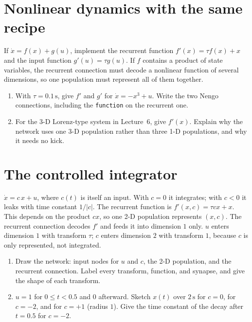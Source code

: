 \documentclass[11pt,letterpaper]{article}
\begin{document}
\section{Nonlinear dynamics with the same recipe}

\begin{idea}
If $\dot x = f(x) + g(u)$, implement the recurrent function $f'(x) = \tau f(x) + x$ and the input function $g'(u) = \tau g(u)$. If $f$ contains a product of state variables, the recurrent connection must decode a nonlinear function of several dimensions, so one population must represent all of them together.
\end{idea}

\begin{enumerate}
\item With $\tau = 0.1\,\mathrm{s}$, give $f'$ and $g'$ for $\dot x = -x^3 + u$. Write the two Nengo connections, including the \texttt{function} on the recurrent one.
\item For the 3-D Lorenz-type system in Lecture~6, give $f'(x)$. Explain why the network uses one 3-D population rather than three 1-D populations, and why it needs no kick.
\end{enumerate}

\section{The controlled integrator}

\begin{idea}
$\dot x = c\,x + u$, where $c(t)$ is itself an input. With $c = 0$ it integrates; with $c < 0$ it leaks with time constant $1/|c|$. The recurrent function is $f'(x, c) = \tau c x + x$. This depends on the product $cx$, so one 2-D population represents $(x, c)$. The recurrent connection decodes $f'$ and feeds it into dimension $1$ only. $u$ enters dimension $1$ with transform $\tau$; $c$ enters dimension $2$ with transform $1$, because $c$ is only represented, not integrated.
\end{idea}

\begin{enumerate}
\item Draw the network: input nodes for $u$ and $c$, the 2-D population, and the recurrent connection. Label every transform, function, and synapse, and give the shape of each transform.
\item $u = 1$ for $0 \le t < 0.5$ and $0$ afterward. Sketch $x(t)$ over $2\,\mathrm{s}$ for $c = 0$, for $c = -2$, and for $c = +1$ (radius $1$). Give the time constant of the decay after $t = 0.5$ for $c = -2$.
\end{enumerate}
\end{document}
